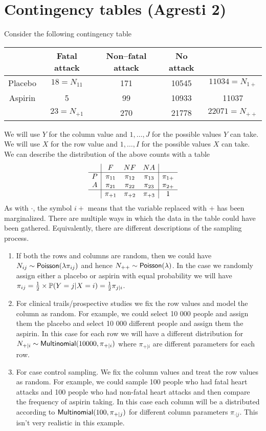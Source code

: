 \section{Contingency tables (Agresti 2)}
Consider the following contingency table
\begin{center}
    \begin{tabular}{c|ccc|c}
        &Fatal attack&Non--fatal attack&No attack&\\
        \hline
        Placebo&$18=N_{11}$&171&10545&$11034=N_{1+}$\\
        Aspirin&5&99&10933&11037\\
        \hline
        &$23=N_{+1}$&270&21778&$22071=N_{++}$
    \end{tabular}
\end{center}
We will use $Y$ for the column value and $1,\ldots,J$ for the possible values $Y$ can take. We will use $X$ for the row value and $1,\ldots,I$ for the possible values $X$ can take. We can describe the distribution of the above counts with a table
\[\begin{array}{c|ccc|c}
    &F&NF&NA&\\
    \hline
    P&\pi_{11}&\pi_{12}&\pi_{13}&\pi_{1+}\\
    A&\pi_{21}&\pi_{22}&\pi_{23}&\pi_{2+}\\
    \hline
    &\pi_{+1}&\pi_{+2}&\pi_{+3}&1    
\end{array}\]
As with $\cdot$, the symbol $i+$ means that the variable replaced with $+$ has been marginalized. There are multiple ways in which the data in the table could have been gathered. Equivalently, there are different descriptions of the sampling process.
\begin{enumerate}
    \item If both the rows and columns are random, then we could have $N_{ij} \sim \mathsf{Poisson}(\lambda\pi_{ij})$ and hence $N_{++} \sim \mathsf{Poisson}(\lambda)$. In the case we randomly assign either a placebo or aspirin with equal probability we will have $\pi_{ij} = \frac{1}{2}\times {\mathbb{P}}(Y=j|X=i) = \frac{1}{2}\pi_{j|i}$.
    \item For clinical trails/prospective studies we fix the row values and model the column as random. For example, we could select 10 000 people and assign them the placebo and select 10 000 different people and assign them the aspirin. In this case for each row we will have a different distribution for $N_{+|i} \sim \mathsf{Multinomial}(10000, \pi_{+|i})$ where $\pi_{+|i}$ are different parameters for each row.
    \item For case control sampling. We fix the column values and treat the row values as random. For example, we could sample 100 people who had fatal heart attacks and 100 people who had non-fatal heart attacks and then compare the frequency of aspirin taking. In this case each column will be a distributed according to $\mathsf{Multinomial}(100, \pi_{+|j})$ for different column parameters $\pi_{\cdot|j}$. This isn't very realistic in this example.
\end{enumerate}
